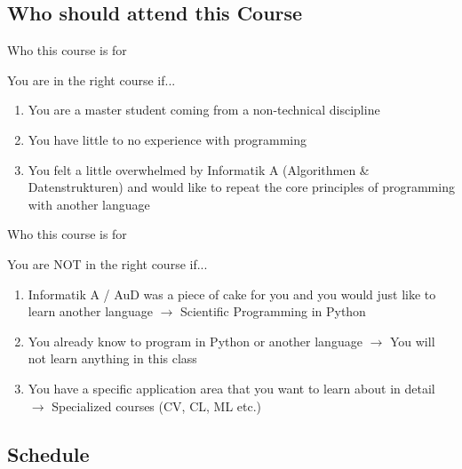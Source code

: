 \subsection{Who should attend this Course}

\begin{frame}{Who this course is for}

    You are in the right course if...
    \newline
    \begin{enumerate}[a]
        \item You are a master student coming from a non-technical discipline
        \item You have little to no experience with programming
        \item You felt a little overwhelmed by Informatik A (Algorithmen \& Datenstrukturen) and would like to repeat the core principles of programming with another language
    \end{enumerate}

\end{frame}

\begin{frame}{Who this course is for}

    You are NOT in the right course if...
    \newline
    \begin{enumerate}[a]
        \item Informatik A / AuD was a piece of cake for you and you would just like to learn another language
        \newline $\rightarrow$ Scientific Programming in Python
        \item You already know to program in Python or another language
        \newline $\rightarrow$ You will not learn anything in this class
        \item You have a specific application area that you want to learn about in detail
        \newline $\rightarrow$ Specialized courses (CV, CL, ML etc.)
    \end{enumerate}

\end{frame}

\subsection{Schedule}

